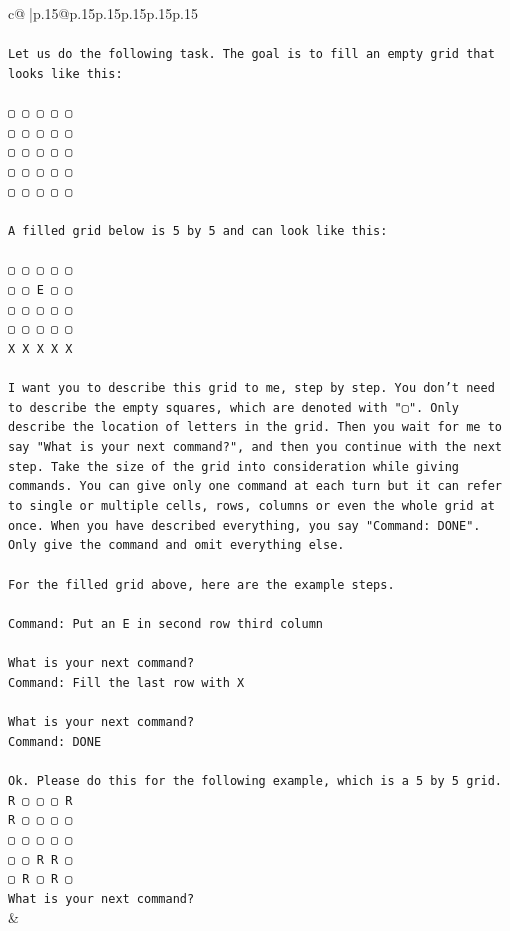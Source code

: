 \documentclass{article}
\begin{document}
{\begin{supertabular}{c@{$\;$}|p{.15\linewidth}@{}p{.15\linewidth}p{.15\linewidth}p{.15\linewidth}p{.15\linewidth}p{.15\linewidth}}
{{{\\ 
\\ 
\texttt{Let us do the following task. The goal is to fill an empty grid that looks like this:} \\
\\ 
\texttt{▢ ▢ ▢ ▢ ▢} \\
\texttt{▢ ▢ ▢ ▢ ▢} \\
\texttt{▢ ▢ ▢ ▢ ▢} \\
\texttt{▢ ▢ ▢ ▢ ▢} \\
\texttt{▢ ▢ ▢ ▢ ▢} \\
\\ 
\texttt{A filled grid below is 5 by 5 and can look like this:} \\
\\ 
\texttt{▢ ▢ ▢ ▢ ▢} \\
\texttt{▢ ▢ E ▢ ▢} \\
\texttt{▢ ▢ ▢ ▢ ▢} \\
\texttt{▢ ▢ ▢ ▢ ▢} \\
\texttt{X X X X X} \\
\\ 
\texttt{I want you to describe this grid to me, step by step. You don't need to describe the empty squares, which are denoted with "▢". Only describe the location of letters in the grid. Then you wait for me to say "What is your next command?", and then you continue with the next step. Take the size of the grid into consideration while giving commands. You can give only one command at each turn but it can refer to single or multiple cells, rows, columns or even the whole grid at once. When you have described everything, you say "Command: DONE". Only give the command and omit everything else.} \\
\\ 
\texttt{For the filled grid above, here are the example steps.} \\
\\ 
\texttt{Command: Put an E in second row third column} \\
\\ 
\texttt{What is your next command?} \\
\texttt{Command: Fill the last row with X} \\
\\ 
\texttt{What is your next command?} \\
\texttt{Command: DONE} \\
\\ 
\texttt{Ok. Please do this for the following example, which is a 5 by 5 grid.} \\
\texttt{R ▢ ▢ ▢ R} \\
\texttt{R ▢ ▢ ▢ ▢} \\
\texttt{▢ ▢ ▢ ▢ ▢} \\
\texttt{▢ ▢ R R ▢} \\
\texttt{▢ R ▢ R ▢} \\
\texttt{What is your next command?} \\
            }
        }
    }
    & \\ \\


\end{supertabular}}
\end{document}
